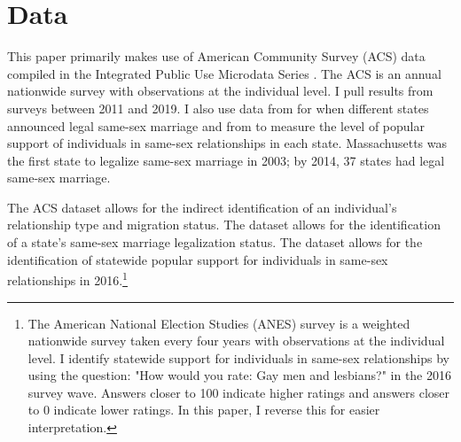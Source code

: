 \documentclass[12pt,letterpaper]{article}
\begin{document}
\section{Data}

This paper primarily makes use of American Community Survey (ACS) data compiled in the Integrated Public Use Microdata Series \citep{28}. The ACS is an annual nationwide survey with observations at the individual level. I pull results from surveys between 2011 and 2019. I also use data from \citet{27} for when different states announced legal same-sex marriage and from \citet{29} to measure the level of popular support of individuals in same-sex relationships in each state. Massachusetts was the first state to legalize same-sex marriage in 2003; by 2014, 37 states had legal same-sex marriage.



The ACS dataset allows for the indirect identification of an individual’s relationship type and migration status. The \citet{27} dataset allows for the identification of a state’s same-sex marriage legalization status. The \citet{29} dataset allows for the identification of statewide popular support for individuals in same-sex relationships in 2016.\footnote{The American National Election Studies (ANES) survey is a weighted nationwide survey taken every four years with observations at the individual level. I identify statewide support for individuals in same-sex relationships by using the question: "How would you rate: Gay men and lesbians?" in the 2016 survey wave. Answers closer to 100 indicate higher ratings and answers closer to 0 indicate lower ratings. In this paper, I reverse this for easier interpretation.}
\end{document}
